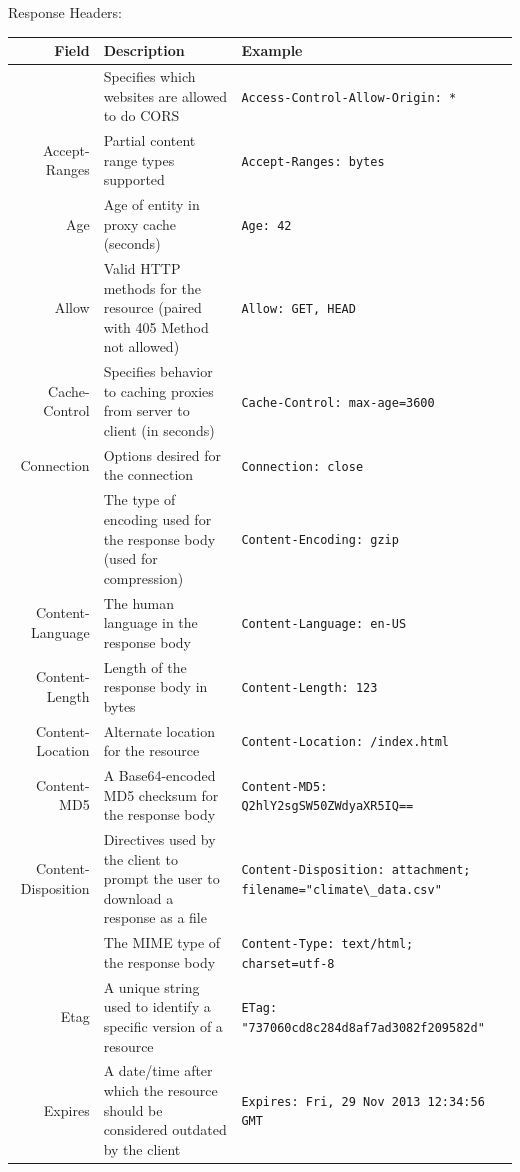 \documentclass[final]{beamer}
\newcommand{\header}[1]{\texttt{\lstinline!#1!}}
\begin{document}
\begin{frame}{}
\begin{columns}
\begin{column}{0.4\textwidth}
\begin{block}{\huge{Response Headers:}}
          \footnotesize
          \begin{tabular}{r p{} p{}}
            Field & Description & Example \\ \hline
            \color{BigBlue}{Access-Control-Allow-Origin} & Specifies which websites are allowed to do CORS & \header{Access-Control-Allow-Origin: * } \\
            Accept-Ranges & Partial content range types supported & \header{Accept-Ranges: bytes } \\
            Age & Age of entity in proxy cache (seconds) & \header{Age: 42 } \\
            Allow & Valid HTTP methods for the resource (paired with 405 Method not allowed) & \header{Allow: GET, HEAD } \\
            Cache-Control & Specifies behavior to caching proxies from server to client (in seconds) & \header{Cache-Control: max-age=3600 } \\
            Connection & Options desired for the connection & \header{Connection: close } \\
            \color{BigBlue}{Content-Encoding} & The type of encoding used for the response body (used for compression) & \header{Content-Encoding: gzip } \\
            Content-Language & The human language in the response body & \header{Content-Language: en-US } \\
            Content-Length & Length of the response body in bytes & \header{Content-Length: 123 } \\
            Content-Location & Alternate location for the resource & \header{Content-Location: /index.html } \\
            Content-MD5 & A Base64-encoded MD5 checksum for the response body & \header{Content-MD5: Q2hlY2sgSW50ZWdyaXR5IQ== } \\
            Content-Disposition & Directives used by the client to prompt the user to download a response as a file & \header{Content-Disposition: attachment;} \header{filename="climate\_data.csv" } \\
            \color{BigBlue}{Content-Type} & The MIME type of the response body & \header{Content-Type: text/html; charset=utf-8 } \\
            Etag & A unique string used to identify a specific version of a resource & \header{ETag: "737060cd8c284d8af7ad3082f209582d" } \\
            Expires & A date/time after which the resource should be considered outdated by the client & \header{Expires: Fri, 29 Nov 2013 12:34:56 GMT } \\

\end{tabular}
\end{block}
\end{column}
\end{columns}
\end{frame}
\end{document}
